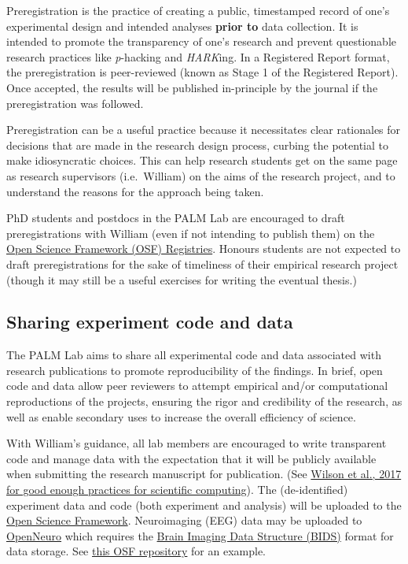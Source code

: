 \documentclass[
]{book}
\theoremstyle{definition}
\theoremstyle{definition}
\theoremstyle{definition}
\theoremstyle{definition}
\theoremstyle{remark}
\begin{document}
Preregistration is the practice of creating a public, timestamped record of one's experimental design and intended analyses \textbf{prior to} data collection. It is intended to promote the transparency of one's research and prevent questionable research practices like \emph{p}-hacking and \emph{HARK}ing. In a Registered Report format, the preregistration is peer-reviewed (known as Stage 1 of the Registered Report). Once accepted, the results will be published in-principle by the journal if the preregistration was followed.

Preregistration can be a useful practice because it necessitates clear rationales for decisions that are made in the research design process, curbing the potential to make idiosyncratic choices. This can help research students get on the same page as research supervisors (i.e.~William) on the aims of the research project, and to understand the reasons for the approach being taken.

PhD students and postdocs in the PALM Lab are encouraged to draft preregistrations with William (even if not intending to publish them) on the \href{https://osf.io/registries/osf/new}{Open Science Framework (OSF) Registries}. Honours students are not expected to draft preregistrations for the sake of timeliness of their empirical research project (though it may still be a useful exercises for writing the eventual thesis.)

\hypertarget{sharing-experiment-code-and-data}{%
\subsection{Sharing experiment code and data}\label{sharing-experiment-code-and-data}}

The PALM Lab aims to share all experimental code and data associated with research publications to promote reproducibility of the findings. In brief, open code and data allow peer reviewers to attempt empirical and/or computational reproductions of the projects, ensuring the rigor and credibility of the research, as well as enable secondary uses to increase the overall efficiency of science.

With William's guidance, all lab members are encouraged to write transparent code and manage data with the expectation that it will be publicly available when submitting the research manuscript for publication. (See \href{https://journals.plos.org/ploscompbiol/article?id=10.1371/journal.pcbi.1005510}{Wilson et al., 2017 for good enough practices for scientific computing}). The (de-identified) experiment data and code (both experiment and analysis) will be uploaded to the \href{https://osf.io}{Open Science Framework}. Neuroimaging (EEG) data may be uploaded to \href{https://openneuro.org/}{OpenNeuro} which requires the \href{https://bids.neuroimaging.io/}{Brain Imaging Data Structure (BIDS)} format for data storage. See \href{https://osf.io/wjr7u/}{this OSF repository} for an example.
\end{document}
